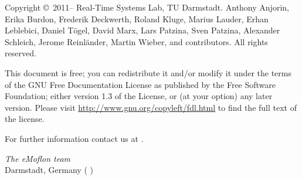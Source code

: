 \begin{small} 
Copyright \copyright~2011--\the\year{} Real-Time Systems Lab, TU Darmstadt.
Anthony Anjorin, Erika Burdon, Frederik Deckwerth, Roland Kluge, Marius Lauder,
Erhan Leblebici, Daniel T\"ogel, David Marx, Lars Patzina, Sven Patzina, Alexander
Schleich, Jerome Reinl\"ander, Martin Wieber, and contributors.
All rights reserved.

This document is free; you can redistribute it and/or modify it under the terms of the GNU Free Documentation License as published by the Free Software Foundation; either version 1.3 of the License, or (at your option) any later version.
Please visit \href{http://www.gnu.org/copyleft/fdl.html}{http://www.gnu.org/copyleft/fdl.html} to find the full text of the license.
 
  
For further information contact us at \eMoflonContact.
  
\vskip3cm
\textit{The eMoflon team}\\
Darmstadt, Germany (\monthword{\month} \the\year)
\end{small}